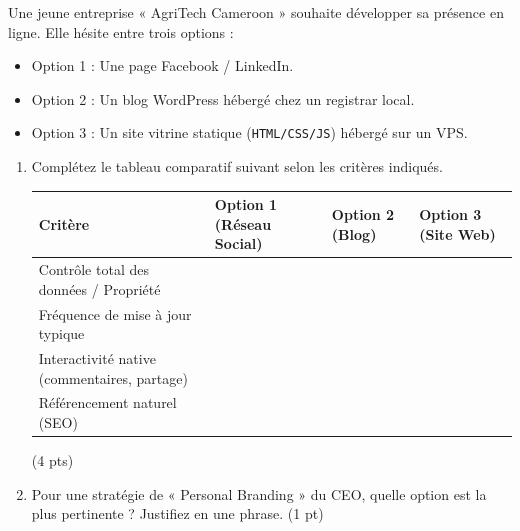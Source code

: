 \documentclass[11pt]{article}
\begin{document}
\begin{exercice}
Une jeune entreprise « AgriTech Cameroon » souhaite développer sa présence en ligne. Elle hésite entre trois options :
\begin{itemize}
    \item Option 1 : Une page Facebook / LinkedIn.
    \item Option 2 : Un blog WordPress hébergé chez un registrar local.
    \item Option 3 : Un site vitrine statique (\texttt{HTML/CSS/JS}) hébergé sur un VPS.
\end{itemize}
\begin{enumerate}
    \item Complétez le tableau comparatif suivant selon les critères indiqués.
    \begin{tabularx}{\linewidth}{|X|>{\centering\arraybackslash}X|>{\centering\arraybackslash}X|>{\centering\arraybackslash}X|}
    \hline
    \textbf{Critère} & \textbf{Option 1 (Réseau Social)} & \textbf{Option 2 (Blog)} & \textbf{Option 3 (Site Web)} \\
    \hline
    Contrôle total des données / Propriété & & & \\
    \hline
    Fréquence de mise à jour typique & & & \\
    \hline
    Interactivité native (commentaires, partage) & & & \\
    \hline
    Référencement naturel (SEO) & & & \\
    \hline
    \end{tabularx} \hfill (4 pts)
    \item Pour une stratégie de « Personal Branding » du CEO, quelle option est la plus pertinente ? Justifiez en une phrase. \hfill (1 pt)
\end{enumerate}
\end{exercice}
\end{document}
